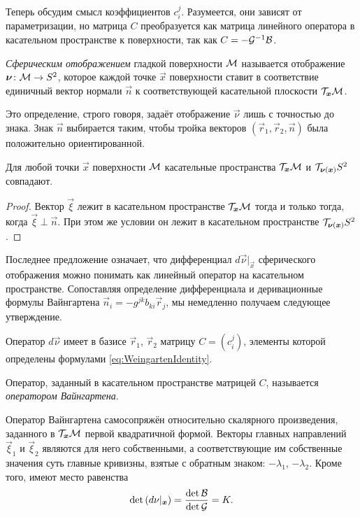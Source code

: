 Теперь обсудим смысл коэффициентов $c^j_i$. Разумеется, они зависят от параметризации, но матрица $C$ преобразуется как матрица линейного оператора в касательном пространстве к поверхности, так как $C = -\mathcal{G}^{-1}\mathcal{B}$.

\begin{definition}
	\textit{Сферическим отображением} гладкой поверхности $\mathcal{M}$ называется отображение $\boldsymbol{\nu}\colon \mathcal{M} \to S^2$, которое каждой точке $\vec{x}$ поверхности ставит в соответствие единичный вектор нормали $\vec{n}$ к соответствующей касательной плоскости $\mathcal{T}_{\boldsymbol{x}}\mathcal{M}$.
\end{definition}

Это определение, строго говоря, задаёт отображение $\vec{\nu}$ лишь с точностью до знака. Знак $\vec{n}$ выбирается таким, чтобы тройка векторов $(\vec{r}_1, \vec{r}_2, \vec{n})$ была положительно ориентированной.

\begin{proposition}
	Для любой точки $\vec{x}$ поверхности $\mathcal{M}$ касательные пространства $\mathcal{T}_{\boldsymbol{x}}\mathcal{M}$ и $\mathcal{T}_{\boldsymbol{\nu}(\boldsymbol{x})}S^2$ совпадают.
\end{proposition}

\begin{proof}
	Вектор $\vec{\xi}$ лежит в касательном пространстве $\mathcal{T}_{\boldsymbol{x}}\mathcal{M}$ тогда и только тогда, когда $\vec{\xi} \perp \vec{n}$. При этом же условии он лежит в касательном пространстве $\mathcal{T}_{\boldsymbol{\nu}(\boldsymbol{x})}S^2$.
\end{proof}

Последнее предложение означает, что дифференциал $d\vec{\nu}|_{\vec{x}}$ сферического отображения можно понимать как линейный оператор на касательном пространстве. Сопоставляя определение дифференциала и деривационные формулы Вайнгартена $\vec{n}_i = -g^{jk}b_{ki}\vec{r}_j$, мы немедленно получаем следующее утверждение.

\begin{proposition}
	Оператор $d\vec{\nu}$ имеет в базисе $\vec{r}_1$, $\vec{r}_2$ матрицу $C = (c^j_i)$, элементы которой определены формулами \eqref{eq:WeingartenIdentity}.
\end{proposition}

\begin{definition}
	Оператор, заданный в касательном пространстве матрицей $C$, называется \textit{оператором Вайнгартена}.
\end{definition}

\begin{theorem} \label{theorem:Weingarten}
	Оператор Вайнгартена самосопряжён относительно скалярного произведения, заданного в $\mathcal{T}_{\boldsymbol{x}}\mathcal{M}$ первой квадратичной формой. Векторы главных направлений $\vec{\xi}_1$ и $\vec{\xi}_2$ являются для него собственными, а соответствующие им собственные значения суть главные кривизны, взятые с обратным знаком: $-\lambda_1$, $-\lambda_2$. Кроме того, имеют место равенства
	\[
		\det\left(d\nu|_{\boldsymbol{x}}\right) = \frac{\det\mathcal{B}}{\det\mathcal{G}} = K.
	\]
\end{theorem}

